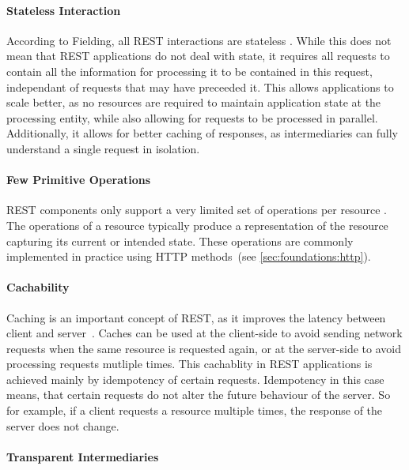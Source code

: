 \paragraph{Stateless Interaction}

According to Fielding, all \ac{REST} interactions are stateless \cite{Fielding2000}.
While this does not mean that \ac{REST} applications do not deal with state, it requires all requests to contain all the information for processing it to be contained in this request, independant of requests that may have preceeded it.
This allows applications to scale better, as no resources are required to maintain application state at the processing entity, while also allowing for requests to be processed in parallel.
Additionally, it allows for better caching of responses, as intermediaries can fully understand a single request in isolation.

\paragraph{Few Primitive Operations}

\ac{REST} components only support a very limited set of operations per resource \cite{Erenkrantz2007}.
The operations of a resource typically produce a representation of the resource capturing its current or intended state.
These operations are commonly implemented in practice using \ac{HTTP} methods~(see \autoref{sec:foundations:http}).

\paragraph{Cachability}

Caching is an important concept of \ac{REST}, as it improves the latency between client and server~\cite{Erenkrantz2007,Fielding2000}.
Caches can be used at the client-side to avoid sending network requests when the same resource is requested again, or at the server-side to avoid processing requests mutliple times.
This cachablity in \ac{REST} applications is achieved mainly by idempotency of certain requests.
Idempotency in this case means, that certain requests do not alter the future behaviour of the server.
So for example, if a client requests a resource multiple times, the response of the server does not change.

\paragraph{Transparent Intermediaries}

